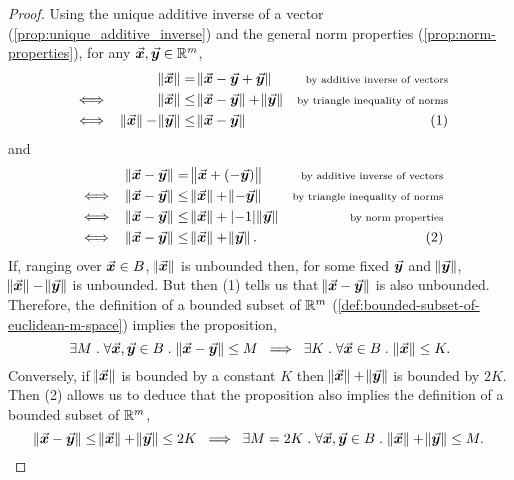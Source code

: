 \documentclass[../MathsNotesBase.tex]{subfiles}
\begin{document}
{		\biggerskip
		\begin{proof}
			Using the unique additive inverse of a vector (\autoref{prop:unique_additive_inverse}) and the general norm properties (\autoref{prop:norm-properties}), for any ${ \vec{\bm{x}},\vec{\bm{y}} \in \mathbb{R}^{m} }$,
			\[\begin{aligned}
				&& \norm{\vec{\bm{x}}} &= \norm{\vec{\bm{x}} - \vec{\bm{y}} + \vec{\bm{y}}} &\text{\scriptsize{by additive inverse of vectors}}\\
				&\iff & \norm{\vec{\bm{x}}} &\leq \norm{\vec{\bm{x}} - \vec{\bm{y}}} + \norm{\vec{\bm{y}}} &\text{\scriptsize{by triangle inequality of norms}} \\
				&\iff & \norm{\vec{\bm{x}}} - \norm{\vec{\bm{y}}} &\leq \norm{\vec{\bm{x}} - \vec{\bm{y}}}  &(1)
			\end{aligned}\]
			and
			\[\begin{aligned}
				&& \norm{\vec{\bm{x}} - \vec{\bm{y}}} &= \norm{\vec{\bm{x}} + (-\vec{\bm{y}})} &\text{\scriptsize{by additive inverse of vectors}}\\
				&\iff & \norm{\vec{\bm{x}} - \vec{\bm{y}}} &\leq \norm{\vec{\bm{x}}} + \norm{-\vec{\bm{y}}} &\text{\scriptsize{by triangle inequality of norms}} \\
				&\iff & \norm{\vec{\bm{x}} - \vec{\bm{y}}} &\leq \norm{\vec{\bm{x}}} + \left\lvert-1\right\rvert\norm{\vec{\bm{y}}} &\text{\scriptsize{by norm properties}} \\
				&\iff & \norm{\vec{\bm{x}} - \vec{\bm{y}}} &\leq \norm{\vec{\bm{x}}} + \norm{\vec{\bm{y}}}.  &(2)
			\end{aligned}\]
			\nl
			If, ranging over ${ \vec{\bm{x}} \in B }$, $\norm{\vec{\bm{x}}}$ is unbounded then, for some fixed $\vec{\bm{y}}$ and $\norm{\vec{\bm{y}}}$, ${ \norm{\vec{\bm{x}}} - \norm{\vec{\bm{y}}} }$ is unbounded. But then (1) tells us that ${ \norm{\vec{\bm{x}} - \vec{\bm{y}}} }$ is also unbounded. Therefore, the definition of a bounded subset of $\mathbb{R}^{m}$ (\ref{def:bounded-subset-of-euclidean-m-space}) implies the proposition,
			\[ \exists M \;.\; \forall \vec{\bm{x}},\vec{\bm{y}} \in B \;.\; \norm{\vec{\bm{x}} - \vec{\bm{y}}} \leq M \; \implies \; \exists K \;.\; \forall \vec{\bm{x}} \in B \;.\; \norm{\vec{\bm{x}}} \leq K. \]
			Conversely, if $\norm{\vec{\bm{x}}}$ is bounded by a constant $K$ then ${ \norm{\vec{\bm{x}}} + \norm{\vec{\bm{y}}} }$ is bounded by $2K$. Then (2) allows us to deduce that the proposition also implies the definition of a bounded subset of $\mathbb{R}^{m}$,
			\[ \norm{\vec{\bm{x}} - \vec{\bm{y}}} \leq \norm{\vec{\bm{x}}} + \norm{\vec{\bm{y}}} \leq 2K \; \implies \; \exists M = 2K \;.\; \forall \vec{\bm{x}},\vec{\bm{y}} \in B \;.\; \norm{\vec{\bm{x}}} + \norm{\vec{\bm{y}}} \leq M. \]
		\end{proof}
	}



	
\pagebreak
\end{document}
